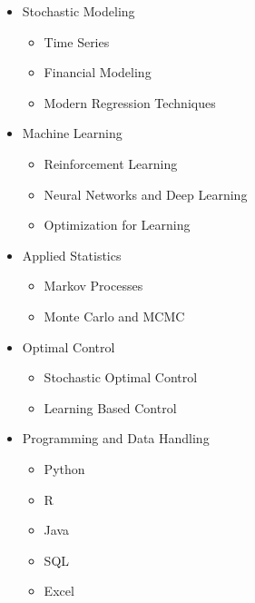 \documentclass[10pt, a4paper, english]{article}
\begin{document}
\begin{paracol}{2}
\begin{itemize}[leftmargin =\widthof{~$\bullet$~}]
\setlength\itemsep{0.1em}
\item Stochastic Modeling
	\begin{itemize}[leftmargin =\widthof{~$\bullet$~}]\footnotesize\vspace{-0.3em}
	\setlength\itemsep{0.1em}
	\item Time Series
	\item Financial Modeling
	\item Modern Regression Techniques
	\end{itemize}
\item Machine Learning
	\begin{itemize}[leftmargin =\widthof{~$\bullet$~}]\footnotesize\vspace{-0.3em}
	\setlength\itemsep{0.1em}
	\item Reinforcement Learning
	\item Neural Networks and Deep Learning
	\item Optimization for Learning
	\end{itemize}
\item Applied Statistics
	\begin{itemize}[leftmargin =\widthof{~$\bullet$~}]\footnotesize\vspace{-0.3em}
	\setlength\itemsep{0.1em}
	\item Markov Processes
	\item Monte Carlo and MCMC
	\end{itemize}
\item Optimal Control
	\begin{itemize}[leftmargin =\widthof{~$\bullet$~}]\footnotesize\vspace{-0.3em}
	\setlength\itemsep{0.1em}
	\item Stochastic Optimal Control
	\item Learning Based Control
	\end{itemize}
\item Programming and Data Handling
	\begin{itemize}[leftmargin =\widthof{~$\bullet$~}]\footnotesize\vspace{-0.3em}
	\setlength\itemsep{0.1em}
	\item[{\makebox[.15cm]{\faPython}}] Python
	\item[{\makebox[.15cm]{\faRProject}}] R
	\item[{\makebox[.15cm]{\faJava}}] Java
	\item[{\makebox[.15cm]{\faDatabase}}] SQL
	\item[{\makebox[.15cm]{\faFileExcel}}] Excel
	\end{itemize}
\end{itemize}


\end{paracol}
\end{document}
